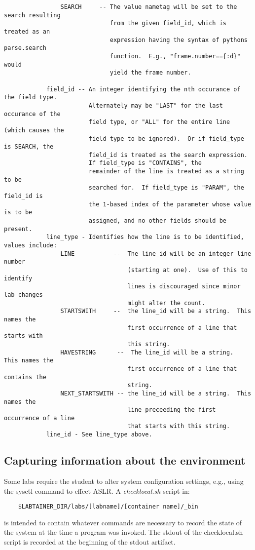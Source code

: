 \documentclass[12pt]{article}
\begin{document}
\begin{verbatim}
                SEARCH     -- The value nametag will be set to the search resulting
                              from the given field_id, which is treated as an
                              expression having the syntax of pythons parse.search 
                              function.  E.g., "frame.number=={:d}" would 
                              yield the frame number.
                              
            field_id -- An integer identifying the nth occurance of the field type.
                        Alternately may be "LAST" for the last occurance of the 
                        field type, or "ALL" for the entire line (which causes the 
                        field type to be ignored).  Or if field_type is SEARCH, the
                        field_id is treated as the search expression. 
                        If field_type is "CONTAINS", the 
                        remainder of the line is treated as a string to be 
                        searched for.  If field_type is "PARAM", the field_id is
                        the 1-based index of the parameter whose value is to be 
                        assigned, and no other fields should be present.
            line_type - Identifies how the line is to be identified, values include:
                LINE           --  The line_id will be an integer line number 
                                   (starting at one).  Use of this to identify 
                                   lines is discouraged since minor lab changes 
                                   might alter the count.
                STARTSWITH     --  the line_id will be a string.  This names the 
                                   first occurrence of a line that starts with 
                                   this string. 
                HAVESTRING      --  The line_id will be a string.  This names the 
                                   first occurrence of a line that contains the 
                                   string.
                NEXT_STARTSWITH -- the line_id will be a string.  This names the 
                                   line preceeding the first occurrence of a line 
                                   that starts with this string. 
            line_id - See line_type above.
\end{verbatim}

\subsection{Capturing information about the environment}
Some labs require the student to alter system configuration settings,
e.g., using the sysctl command to effect ASLR. A \textit{checklocal.sh} script in:
\begin{verbatim}
    $LABTAINER_DIR/labs/[labname]/[container name]/_bin
\end{verbatim}
is intended to contain whatever commands are necessary to record the 
state of the system at the time a program was invoked.  The stdout of
the checklocal.sh script is recorded at the beginning of the stdout artifact. 
\end{document}
